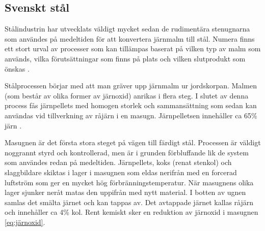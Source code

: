  



\subsection{Svenskt stål}

Stålindustrin har utvecklats väldigt mycket sedan de rudimentära stenugnarna som användes på medeltiden för att konvertera järnmalm till stål. Numera finns ett stort urval av processer som kan tillämpas baserat på vilken typ av malm som används, vilka förutsättningar som finns på plats och vilken slutprodukt som önskas \cite{Pehlke2014a}.

Stålprocessen börjar med att man gräver upp järnmalm ur jordskorpan. Malmen (som består av olika former av järnoxid) anrikas i flera steg. I slutet av denna process fås järnpellets med homogen storlek och sammansättning som sedan kan användas vid tillverkning av råjärn i en masugn. Järnpelletsen innehåller ca 65\% järn \cite{RobertVikman}.

Masugnen är det första stora steget på vägen till färdigt stål. Processen är väldigt noggrannt styrd och kontrollerad, men är i grunden förbluffande lik de system som användes redan på medeltiden. Järnpellets, koks (renat stenkol) och slaggbildare skiktas i lager i masugnen som eldas nerifrån med en forcerad luftström som ger en mycket hög förbränningstemperatur. När masugnens olika lager sjunker neråt matas den uppifrån med nytt material. I botten av ugnen samlas det smälta järnet och kan tappas av. Det avtappade järnet kallas råjärn och innehåller ca 4\% kol. Rent kemiskt sker en reduktion av järnoxid i masugnen \eqref{eq:järnoxid}.

